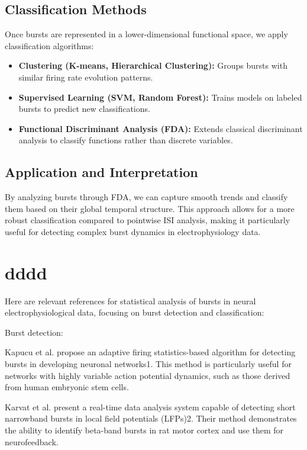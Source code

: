 \documentclass[a4paper,9pt]{extarticle}
\begin{document}
\subsection{Classification Methods}

Once bursts are represented in a lower-dimensional functional space, we apply classification algorithms:

\begin{itemize}
    \item \textbf{Clustering (K-means, Hierarchical Clustering):} Groups bursts with similar firing rate evolution patterns.
    \item \textbf{Supervised Learning (SVM, Random Forest):} Trains models on labeled bursts to predict new classifications.
    \item \textbf{Functional Discriminant Analysis (FDA):} Extends classical discriminant analysis to classify functions rather than discrete variables.
\end{itemize}

\subsection{Application and Interpretation}

By analyzing bursts through FDA, we can capture smooth trends and classify them based on their global temporal structure. This approach allows for a more robust classification compared to pointwise ISI analysis, making it particularly useful for detecting complex burst dynamics in electrophysiology data.


\section{dddd}
Here are relevant references for statistical analysis of bursts in neural electrophysiological data, focusing on burst detection and classification:

Burst detection:

Kapucu et al. \cite{kapucu2012a}
propose an adaptive firing statistics-based algorithm for detecting bursts in developing neuronal networks1. This method is particularly useful for networks with highly variable action potential dynamics, such as those derived from human embryonic stem cells.

Karvat et al. \cite{karvat2022a} present a real-time data analysis system capable of detecting short narrowband bursts in local field potentials (LFPs)2. Their method demonstrates the ability to identify beta-band bursts in rat motor cortex and use them for neurofeedback.
\end{document}
